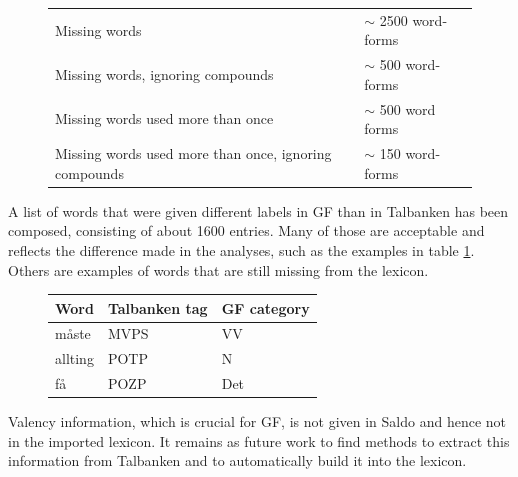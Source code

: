 \documentclass{report}
\begin{document}
\begin{figure}[h]
\begin{tabular}{|l|l|}
\hline
Missing words & $\sim$ 2500 word-forms\\
Missing words, ignoring compounds & $\sim$ 500 word-forms\\
Missing words used more than once & $\sim$ 500 word forms\\
Missing words used more than once, ignoring compounds & $\sim$ 150 word-forms\\
\hline
\end{tabular}
\caption{}
\end{figure}

A list of words that were given different labels in GF than in Talbanken has been
composed, consisting of about 1600 entries. Many of those are
acceptable and reflects the difference 
made in the analyses, such as the examples in table \ref{tab:saldodiff}.
Others are examples of words that are still missing from
the lexicon.
\begin{figure}[h]
\begin{tabular}{|lll|}
\hline
Word    & Talbanken tag & GF category \\
\hline
måste   & MVPS          & VV \\
allting & POTP          & N \\
få      & POZP          & Det \\
\hline
\end{tabular}
\caption{}
\label{tab:saldodiff}
\end{figure}

Valency information, which is crucial for GF, is not given in Saldo and
hence not in the imported lexicon. It remains as future work to find methods 
to extract this information from Talbanken and to automatically build
it into the lexicon. 
\end{document}
